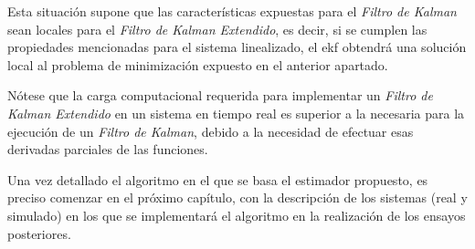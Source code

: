 Esta situación supone que las características expuestas para el \emph{Filtro de Kalman} sean locales para el \emph{Filtro de Kalman Extendido}, es decir, si se cumplen las propiedades mencionadas para el sistema linealizado, el \acrshort{ekf} obtendrá una solución local al problema de minimización expuesto en el anterior apartado. \par 

Nótese que la carga computacional requerida para implementar un \emph{Filtro de Kalman Extendido} en un sistema en tiempo real es superior a la necesaria para la ejecución de un \emph{Filtro de Kalman}, debido a la necesidad de efectuar esas derivadas parciales de las funciones. \par 

Una vez detallado el algoritmo en el que se basa el estimador propuesto, es preciso comenzar en el próximo capítulo, con la descripción de los sistemas (real y simulado) en los que se implementará el algoritmo en la realización de los ensayos posteriores. \par 